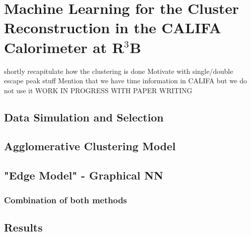 \section{Machine Learning for the Cluster Reconstruction in the CALIFA Calorimeter at R$^3$B}
shortly recapitulate how the clustering is done
Motivate with single/double escape peak stuff
Mention that we have time information in CALIFA but we do not use it
WORK IN PROGRESS WITH PAPER WRITING
\subsection{Data Simulation and Selection}

\subsection{Agglomerative Clustering Model}

\subsection{"Edge Model" - Graphical NN}

\subsubsection{Combination of both methods}


\subsection{Results}



